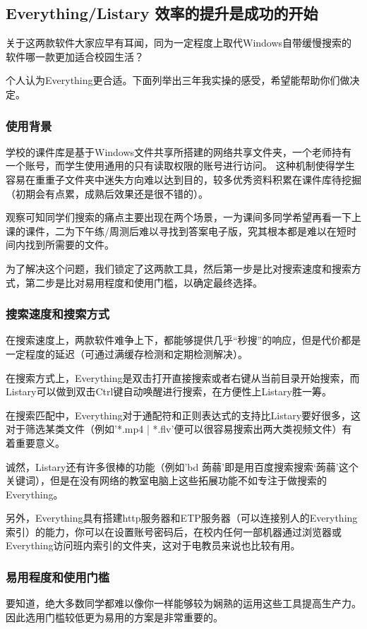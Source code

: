 \documentclass{article}
\begin{document}
    \subsection{Everything/Listary 效率的提升是成功的开始}
        关于这两款软件大家应早有耳闻，同为一定程度上取代Windows自带缓慢搜索的软件哪一款更加适合校园生活？

        个人认为Everything更合适。下面列举出三年我实操的感受，希望能帮助你们做决定。
        \subsubsection{使用背景}
            学校的课件库是基于Windows文件共享所搭建的网络共享文件夹，一个老师持有一个账号，而学生使用通用的只有读取权限的账号进行访问。
            这种机制使得学生容易在重重子文件夹中迷失方向难以达到目的，较多优秀资料积累在课件库待挖掘（初期会有点累，成熟后效果还是很不错的）。

            观察可知同学们搜索的痛点主要出现在两个场景，一为课间多同学希望再看一下上课的课件，二为下午练/周测后难以寻找到答案电子版，究其根本都是难以在短时间内找到所需要的文件。

            为了解决这个问题，我们锁定了这两款工具，然后第一步是比对搜索速度和搜索方式，第二步是比对易用程度和使用门槛，以确定最终选择。
        \subsubsection{搜索速度和搜索方式}
            在搜索速度上，两款软件难争上下，都能够提供几乎“秒搜”的响应，但是代价都是一定程度的延迟（可通过满缓存检测和定期检测解决）。

            在搜索方式上，Everything是双击打开直接搜索或者右键从当前目录开始搜索，而Listary可以做到双击Ctrl键自动唤醒进行搜索，在方便性上Listary胜一筹。

            在搜索匹配中，Everything对于通配符和正则表达式的支持比Listary要好很多，这对于筛选某类文件（例如'*.mp4 | *.flv'便可以很容易搜索出两大类视频文件）有着重要意义。

            诚然，Listary还有许多很棒的功能（例如'bd 蒟蒻'即是用百度搜索搜索‘蒟蒻’这个关键词），但是在没有网络的教室电脑上这些拓展功能不如专注于做搜索的Everything。
        
            另外，Everything具有搭建http服务器和ETP服务器（可以连接别人的Everything索引）的能力，你可以在设置账号密码后，在校内任何一部机器通过浏览器或Everything访问班内索引的文件夹，这对于电教员来说也比较有用。
        \subsubsection{易用程度和使用门槛}
            要知道，绝大多数同学都难以像你一样能够较为娴熟的运用这些工具提高生产力。因此选用门槛较低更为易用的方案是非常重要的。
\end{document}
